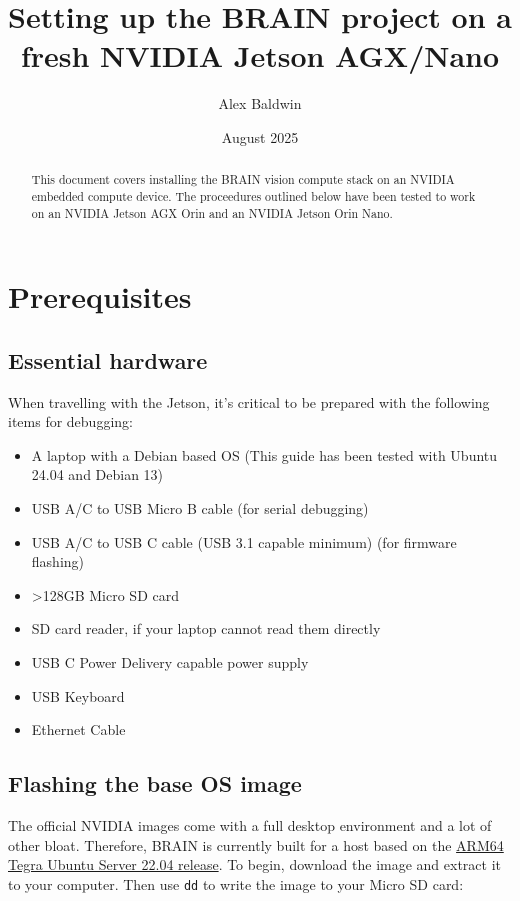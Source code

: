 \documentclass[11pt]{article}
\title{Setting up the BRAIN project on a fresh NVIDIA Jetson AGX/Nano}
\author{Alex Baldwin}
\date{August 2025}
\begin{document}
\maketitle

\begin{abstract}

This document covers installing the BRAIN vision compute stack on an NVIDIA embedded compute device. The proceedures outlined below have been tested to work on an NVIDIA Jetson AGX Orin and an NVIDIA Jetson Orin Nano.

\end{abstract}

\tableofcontents

\newpage

\section{Prerequisites}

\subsection{Essential hardware}

When travelling with the Jetson, it's critical to be prepared with the following items for debugging:
\begin{itemize}
\item A laptop with a Debian based OS (This guide has been tested with Ubuntu 24.04 and Debian 13)
\item USB A/C to USB Micro B cable (for serial debugging)
\item USB A/C to USB C cable (USB 3.1 capable minimum) (for firmware flashing)
\item \textgreater{}128GB Micro SD card
\item SD card reader, if your laptop cannot read them directly
\item USB C Power Delivery capable power supply
\item USB Keyboard
\item Ethernet Cable
\end{itemize}

\subsection{Flashing the base OS image}

The official NVIDIA images come with a full desktop environment and a lot of other bloat. Therefore, BRAIN is currently built for a host based on the \href{https://cdimage.ubuntu.com/releases/jammy/release/nvidia-tegra/ubuntu-22.04-preinstalled-server-arm64+tegra-jetson.img.xz}{ARM64 Tegra Ubuntu Server 22.04 release}. To begin, download the image and extract it to your computer. Then use \texttt{dd} to write the image to your Micro SD card:
\end{document}
